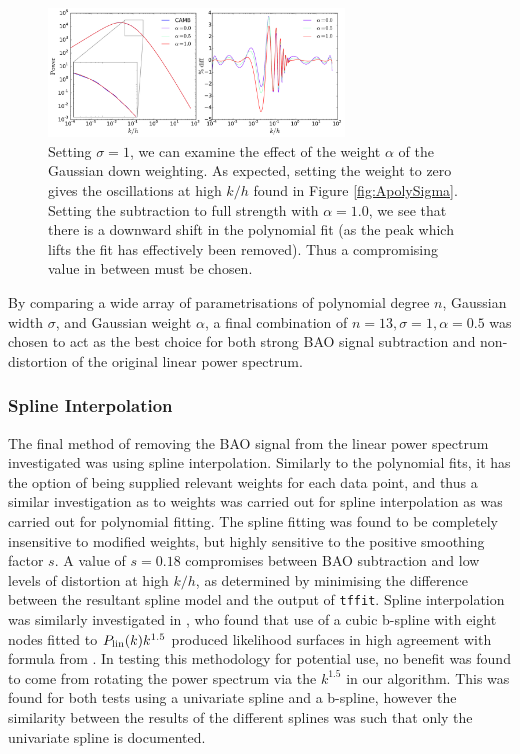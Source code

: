 \documentclass[a4paper,fleqn,usenatbib]{mnras}
\begin{document}
	\begin{figure}
		\begin{center}
			\includegraphics[width=0.7\textwidth]{ApolyWeight.pdf}
			\caption{Setting $\sigma = 1$, we can examine the effect of the weight $\alpha$ of the Gaussian down weighting. As expected, setting the weight to zero gives the oscillations at high $k/h$ found in Figure \ref{fig:ApolySigma}. Setting the subtraction to full strength with $\alpha = 1.0$, we see that there is a downward shift in the polynomial fit (as the peak which lifts the fit has effectively been removed). Thus a compromising value in between must be chosen.}
			\label{fig:ApolyWeight}
		\end{center}
	\end{figure}
	
	
	By comparing a wide array of parametrisations of polynomial degree $n$, Gaussian width $\sigma$, and Gaussian weight $\alpha$, a final combination of $n=13, \sigma=1, \alpha=0.5$ was chosen to act as the best choice for both strong BAO signal subtraction and non-distortion of the original linear power spectrum.

	
	\subsubsection{Spline Interpolation}
	
	
	The final method of removing the BAO signal from the linear power spectrum investigated was using spline interpolation. Similarly to the polynomial fits, it has the option of being supplied relevant weights for each data point, and thus a similar investigation as to weights was carried out for spline interpolation as was carried out for polynomial fitting. The spline fitting was found to be completely insensitive to modified weights, but highly sensitive to the positive smoothing factor $s$. A value of $s = 0.18$ compromises between BAO subtraction and low levels of distortion at high $k/h$, as determined by minimising the difference between the resultant spline model and the output of \verb;tffit;. Spline interpolation was similarly investigated in \citet{ReidPercival2010}, who found that use of a cubic b-spline with eight nodes fitted to $P_{\rm{lin}}(k) k^{1.5}$ produced likelihood surfaces in high agreement with formula from \citet{EisensteinHu1998}. In testing this methodology for potential use, no benefit was found to come from rotating the power spectrum via the $k^{1.5}$ in our algorithm. This was found for both tests using a univariate spline and a b-spline, however the similarity between the results of the different splines was such that only the univariate spline is documented.
	
\end{document}
